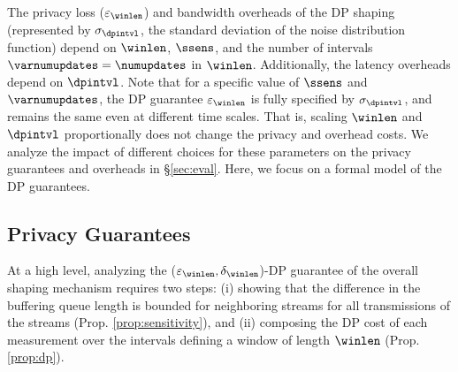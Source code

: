 The privacy loss ($\varepsilon_{\winlen}$) and bandwidth overheads of the DP
shaping (represented by $\sigma_\dpintvl$, \ie the standard deviation of the
noise distribution function) depend on
$\winlen$, $\ssens$,
and the number of intervals $\varnumupdates = \numupdates$ in $\winlen$.
Additionally, the latency overheads depend on $\dpintvl$.
Note that for a specific value of $\ssens$ and $\varnumupdates$, the DP guarantee
$\varepsilon_{\winlen}$ is fully specified by $\sigma_\dpintvl$, and remains the same even at
different time scales.
That is, scaling $\winlen$ and $\dpintvl$ proportionally does not change the
privacy and overhead costs.
We analyze the impact of different choices for these parameters on
the privacy guarantees and overheads in \S\ref{sec:eval}. Here, we focus on a
formal model of the DP guarantees.



\subsection{Privacy Guarantees}
\label{subsec:dp-proof}
At a high level, analyzing the  ($\varepsilon_{\winlen}, \delta_{\winlen}$)-DP
guarantee of the overall shaping mechanism requires two steps: (i) showing that
the difference in the buffering queue length is bounded for neighboring streams
for all transmissions of the streams (Prop. \ref{prop:sensitivity}), and (ii)
composing the DP cost of each measurement over the intervals defining a window
of length $\winlen$ (Prop. \ref{prop:dp}).

